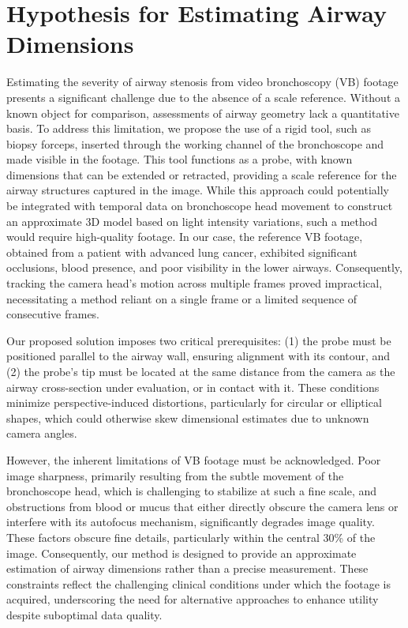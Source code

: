 \section{Hypothesis for Estimating Airway Dimensions}
Estimating the severity of airway stenosis from video bronchoscopy (VB) footage presents a significant challenge due to the absence of a scale reference. Without a known object for comparison, assessments of airway geometry lack a quantitative basis. To address this limitation, we propose the use of a rigid tool, such as biopsy forceps, inserted through the working channel of the bronchoscope and made visible in the footage. This tool functions as a probe, with known dimensions that can be extended or retracted, providing a scale reference for the airway structures captured in the image. While this approach could potentially be integrated with temporal data on bronchoscope head movement to construct an approximate 3D model based on light intensity variations, such a method would require high-quality footage. In our case, the reference VB footage, obtained from a patient with advanced lung cancer, exhibited significant occlusions, blood presence, and poor visibility in the lower airways. Consequently, tracking the camera head’s motion across multiple frames proved impractical, necessitating a method reliant on a single frame or a limited sequence of consecutive frames.

Our proposed solution imposes two critical prerequisites: (1) the probe must be positioned parallel to the airway wall, ensuring alignment with its contour, and (2) the probe’s tip must be located at the same distance from the camera as the airway cross-section under evaluation, or in contact with it. These conditions minimize perspective-induced distortions, particularly for circular or elliptical shapes, which could otherwise skew dimensional estimates due to unknown camera angles.

However, the inherent limitations of VB footage must be acknowledged. Poor image sharpness, primarily resulting from the subtle movement of the bronchoscope head, which is challenging to stabilize at such a fine scale, and obstructions from blood or mucus that either directly obscure the camera lens or interfere with its autofocus mechanism, significantly degrades image quality. These factors obscure fine details, particularly within the central 30\% of the image. Consequently, our method is designed to provide an approximate estimation of airway dimensions rather than a precise measurement. These constraints reflect the challenging clinical conditions under which the footage is acquired, underscoring the need for alternative approaches to enhance utility despite suboptimal data quality.

